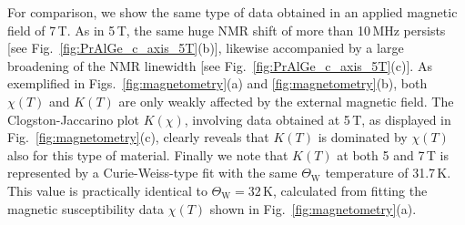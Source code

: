 \documentclass[aps,prb,a4paper,10pt,twocolumn,showpacs,floatfix,superscriptaddress,preprintnumbers,longbibliography]{revtex4-2}
\newcommand{\tcr}[1]{\textcolor{black}{#1}}
\begin{document}
For comparison, we show the same type of data obtained in an applied 
magnetic field of 7\,T. As in 5\,T, the same huge NMR shift of more 
than 10\,MHz persists [see Fig.~\ref{fig:PrAlGe_c_axis_5T}(b)], 
likewise accompanied by a large broadening of the NMR linewidth %
[see Fig.~\ref{fig:PrAlGe_c_axis_5T}(c)].
%
As exemplified in Figs.~\ref{fig:magnetometry}(a) and \ref{fig:magnetometry}(b),
both $\chi(T)$ and $K(T)$ are only weakly affected by the %
external magnetic field. The Clogston-Jaccarino plot $K(\chi)$, involving data 
obtained at 5\,T, as displayed in Fig.~\ref{fig:magnetometry}(c), clearly
reveals that $K(T)$ is dominated by $\chi(T)$ also for this type of material.
Finally we note that $K(T)$ at both 5 and 7\,T is represented by a
Curie-Weiss-type fit with the same $\Theta_\mathrm{W}$ temperature of
31.7\,K. This value is practically identical to $\Theta_\mathrm{W} = 32$\,K,
calculated from fitting the magnetic susceptibility data $\chi(T)$ shown
in Fig.~\ref{fig:magnetometry}(a).

%


%
%
\end{document}
